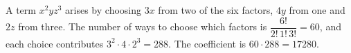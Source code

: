 A term $x^2yz^3$ arises by choosing $3x$ from two of the six factors, $4y$ from one and $2z$ from three. The number of ways to choose which factors is $\dfrac{6!}{2!\,1!\,3!}=60$, and each choice contributes $3^2\cdot4\cdot2^3=288$. The coefficient is $60\cdot288=\boxed{17280}$.
